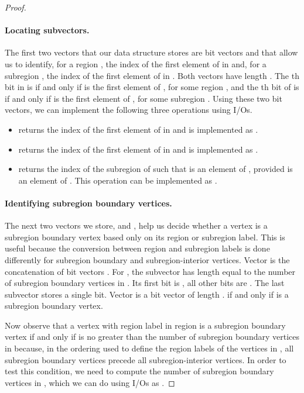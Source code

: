 \begin{proof}
\paragraph{Locating subvectors.}


  The first two vectors that our data structure stores are bit vectors
   and  that
  allow us to identify, for a region , the index of the first
  element of  in  and, for a subregion ,
  the index of the first element of  in .
  Both vectors have length .
  The th bit in  is  if and only if  is the
  first element of , for some region ,
  and the th bit of  is 
  if and only if  is the first element of , for some
  subregion .
  Using these two bit vectors, we can implement the following three operations
  using  I/Os.
  \begin{itemize}
  \item  returns the index of the first element of 
    in  and is implemented as .
  \item  returns the index of the first element of 
    in  and is implemented as
    .
  \item  returns the index  of the subregion 
    of  such that  is an element of  ,
    provided  is an element of .
    This operation can be implemented as
    .
  \end{itemize}

\paragraph{Identifying subregion boundary vertices.}


  The next two vectors we store,  and , help us decide whether
  a vertex is a subregion boundary vertex based only on its region or subregion
  label.
  This is useful because the conversion between region and subregion
  labels is done differently for subregion boundary and subregion-interior
  vertices.
  Vector  is the concatenation of  bit vectors
  .
  For , the subvector  has length equal to the
  number of subregion boundary vertices in .
  Its first bit is , all other bits are .
  The last subvector  stores a single  bit.
  Vector  is a bit vector of length .
   if and only if  is a subregion boundary
  vertex.

  Now observe that a vertex  with region label  in region
   is a subregion boundary vertex if and only if
   is no greater than the number of subregion boundary vertices
  in  because, in the ordering used to define
  the region labels of the vertices in , all subregion boundary
  vertices precede all subregion-interior vertices.
  In order to test this condition, we need to compute the number of subregion
  boundary vertices in , which we can do using  I/Os
  as .
 

\end{proof}
